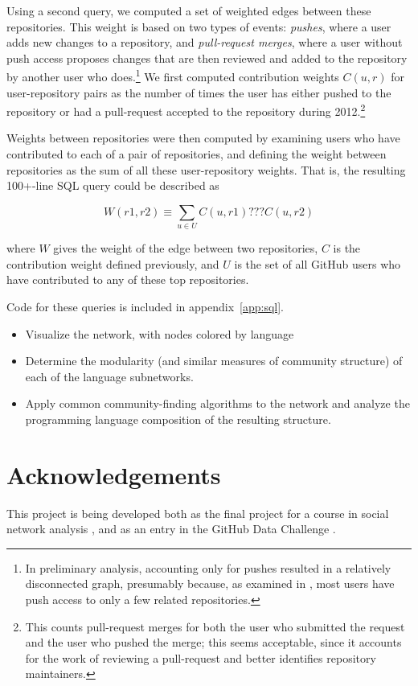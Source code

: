 \documentclass[twocolumn]{article}
\begin{document}
Using a second query, we computed a set of weighted edges between these
repositories. This weight is based on two types of events: \emph{pushes}, where
a user adds new changes to a repository, and \emph{pull-request merges}, where a
user without push access proposes changes that are then reviewed and added to
the repository by another user who does.\footnote{In preliminary analysis,
accounting only for pushes resulted in a relatively disconnected graph,
presumably because, as examined in \cite{khadke}, most users have push access to only a few related
repositories.} We first computed contribution weights $C(u, r)$ for
user-repository pairs as the number of times the user has either pushed to the
repository or had a pull-request accepted to the repository during
2012.\footnote{This counts pull-request merges for both the user who submitted
the request and the user who pushed the merge; this seems acceptable, since it
accounts for the work of reviewing a pull-request and better identifies
repository maintainers.}

Weights between repositories were then computed by examining users who have
contributed to each of a pair of repositories, and defining the weight between
repositories as the sum of all these user-repository weights. That is, the
resulting 100+-line SQL query could be described as

\begin{equation}
    W(r1, r2) \equiv \sum_{u \in U} C(u, r1) ??? C(u, r2)
\end{equation}

where $W$ gives the weight of the edge between two repositories, $C$ is the
contribution weight defined previously, and $U$ is the set of all GitHub users
who have contributed to any of these top repositories.

Code for these queries is included in appendix~\ref{app:sql}.

\begin{itemize}
    \item Visualize the network, with nodes colored by language
    \item Determine the modularity (and similar measures of community structure)
        of each of the language subnetworks.
    \item Apply common community-finding algorithms to the network and analyze
        the programming language composition of the resulting structure.
\end{itemize}

\section{Acknowledgements}
This project is being developed both as the final project for a course in social
network analysis \cite{snacourse}, and as an entry in the GitHub Data Challenge
\cite{doll13}.
\end{document}
